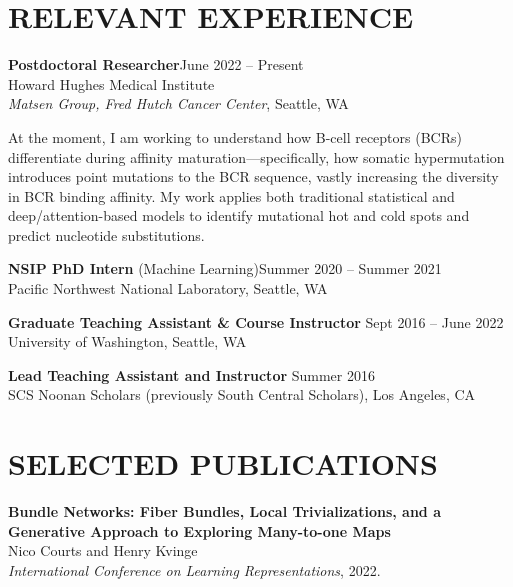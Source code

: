 \documentclass[margin]{res} %
\begin{document}
\begin{resume}

\vspace{-2.5ex}
\section{RELEVANT EXPERIENCE}

{\bf Postdoctoral Researcher}\hfill June 2022 -- Present\\
Howard Hughes Medical Institute\\
\textit{Matsen Group, Fred Hutch Cancer Center}, Seattle, WA

\vspace{-0.1in}At the moment, I am working to understand how B-cell receptors (BCRs) differentiate
during affinity maturation---specifically, how somatic hypermutation introduces point mutations to 
the BCR sequence, vastly increasing the diversity in BCR binding affinity. My work applies both traditional statistical
and deep/attention-based models to identify mutational hot and cold spots and predict nucleotide substitutions.

\textbf{NSIP PhD Intern} (Machine Learning)\hfill Summer 2020 -- Summer 2021\\
Pacific Northwest National Laboratory, Seattle, WA

{\bf Graduate Teaching Assistant \& Course Instructor} \hfill Sept 2016 -- June 2022 \\
University of Washington, Seattle, WA
 
{\bf Lead Teaching Assistant and Instructor} \hfill Summer 2016 \\
SCS Noonan Scholars (previously South Central Scholars), Los Angeles, CA


\section{SELECTED PUBLICATIONS}
\textbf{Bundle Networks: Fiber Bundles, Local Trivializations, and a Generative Approach to Exploring Many-to-one Maps}\\
Nico Courts and Henry Kvinge\\
\textit{International Conference on Learning Representations}, 2022.


\end{resume}
\end{document}
